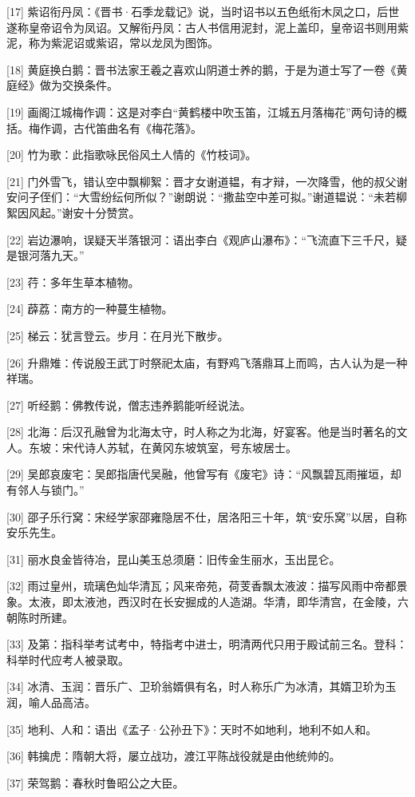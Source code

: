 \documentclass[12pt,UTF8]{ctexbook}
\begin{document}
[17] 紫诏衔丹凤：《晋书·石季龙载记》说，当时诏书以五色纸衔木凤之口，后世遂称皇帝诏令为凤诏。又解衔丹凤：古人书信用泥封，泥上盖印，皇帝诏书则用紫泥，称为紫泥诏或紫诏，常以龙凤为图饰。

[18] 黄庭换白鹅：晋书法家王羲之喜欢山阴道士养的鹅，于是为道士写了一卷《黄庭经》做为交换条件。

[19] 画阁江城梅作调：这是对李白“黄鹤楼中吹玉笛，江城五月落梅花”两句诗的概括。梅作调，古代笛曲名有《梅花落》。

[20] 竹为歌：此指歌咏民俗风土人情的《竹枝词》。

[21] 门外雪飞，错认空中飘柳絮：晋才女谢道韫，有才辩，一次降雪，他的叔父谢安问子侄们：“大雪纷纭何所似？”谢朗说：“撒盐空中差可拟。”谢道韫说：“未若柳絮因风起。”谢安十分赞赏。

[22] 岩边瀑响，误疑天半落银河：语出李白《观庐山瀑布》：“飞流直下三千尺，疑是银河落九天。”

[23] 荇：多年生草本植物。

[24] 薜荔：南方的一种蔓生植物。

[25] 梯云：犹言登云。步月：在月光下散步。

[26] 升鼎雉：传说殷王武丁时祭祀太庙，有野鸡飞落鼎耳上而鸣，古人认为是一种祥瑞。

[27] 听经鹅：佛教传说，僧志违养鹅能听经说法。

[28] 北海：后汉孔融曾为北海太守，时人称之为北海，好宴客。他是当时著名的文人。东坡：宋代诗人苏轼，在黄冈东坡筑室，号东坡居士。

[29] 吴郎哀废宅：吴郎指唐代吴融，他曾写有《废宅》诗：“风飘碧瓦雨摧垣，却有邻人与锁门。”

[30] 邵子乐行窝：宋经学家邵雍隐居不仕，居洛阳三十年，筑“安乐窝”以居，自称安乐先生。

[31] 丽水良金皆待冶，昆山美玉总须磨：旧传金生丽水，玉出昆仑。

[32] 雨过皇州，琉璃色灿华清瓦；风来帝苑，荷芰香飘太液波：描写风雨中帝都景象。太液，即太液池，西汉时在长安掘成的人造湖。华清，即华清宫，在金陵，六朝陈时所建。

[33] 及第：指科举考试考中，特指考中进士，明清两代只用于殿试前三名。登科：科举时代应考人被录取。

[34] 冰清、玉润：晋乐广、卫玠翁婿俱有名，时人称乐广为冰清，其婿卫玠为玉润，喻人品高洁。

[35] 地利、人和：语出《孟子·公孙丑下》：天时不如地利，地利不如人和。

[36] 韩擒虎：隋朝大将，屡立战功，渡江平陈战役就是由他统帅的。

[37] 荣驾鹅：春秋时鲁昭公之大臣。
\end{document}
